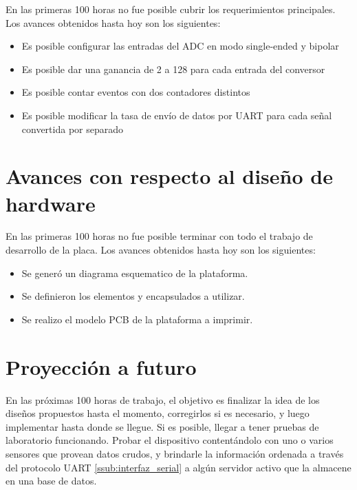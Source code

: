 \documentclass{article}
\theoremstyle{definition}
\theoremstyle{remark}
\begin{document}
En las primeras 100 horas no fue posible cubrir los requerimientos principales. Los avances obtenidos hasta hoy son los siguientes:

\begin{itemize}
  \item Es posible configurar las entradas del ADC en modo single-ended y bipolar
  \item Es posible dar una ganancia de 2 a 128 para cada entrada del conversor
  \item Es posible contar eventos con dos contadores distintos
  \item Es posible modificar la tasa de envío de datos por UART para cada señal convertida por separado
\end{itemize}


\section{Avances con respecto al diseño de hardware} %
\label{sec:avances_con_respecto_al_diseno_de_hardware}

En las primeras 100 horas no fue posible terminar con todo el trabajo de desarrollo de la placa. Los avances obtenidos hasta hoy son los siguientes:

\begin{itemize}
    \item Se generó un diagrama esquematico de la plataforma.
    \item Se definieron los elementos y encapsulados a utilizar.
    \item Se realizo el modelo PCB de la plataforma a imprimir.
\end{itemize}



\section{Proyección a futuro} %
\label{sec:proyeccion_a_futuro}

En las próximas 100 horas de trabajo, el objetivo es finalizar la idea de los diseños propuestos hasta el momento, corregirlos si es necesario, y luego implementar hasta donde se llegue. Si es posible, llegar a tener pruebas de laboratorio funcionando. Probar el dispositivo contentándolo con uno o varios sensores que provean datos crudos, y brindarle la información ordenada a través del protocolo UART \ref{ssub:interfaz_serial} a algún servidor activo que la almacene en una base de datos.
\end{document}
